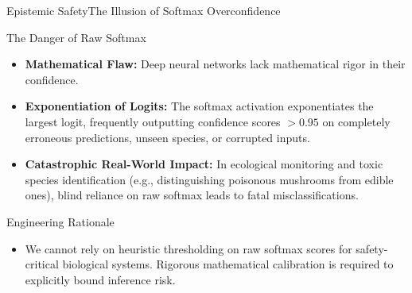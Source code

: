 \begin{frame}{Epistemic Safety}{The Illusion of Softmax Overconfidence}
    \begin{block}{The Danger of Raw Softmax}
        \begin{itemize}\small
            \item \textbf{Mathematical Flaw:} Deep neural networks lack mathematical rigor in their confidence.
            \item \textbf{Exponentiation of Logits:} The softmax activation exponentiates the largest logit, frequently outputting confidence scores $> 0.95$ on completely erroneous predictions, unseen species, or corrupted inputs.
            \item \textbf{Catastrophic Real-World Impact:} In ecological monitoring and toxic species identification (e.g., distinguishing poisonous mushrooms from edible ones), blind reliance on raw softmax leads to fatal misclassifications.
        \end{itemize}
    \end{block}

    \begin{block}{Engineering Rationale}
        \begin{itemize}\small
            \item We cannot rely on heuristic thresholding on raw softmax scores for safety-critical biological systems. Rigorous mathematical calibration is required to explicitly bound inference risk.
        \end{itemize}
    \end{block}


\end{frame}


